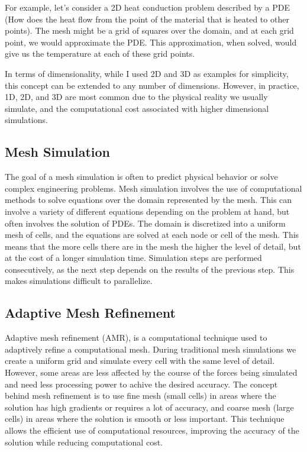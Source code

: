 \documentclass[12pt, a4paper]{scrartcl}
\begin{document}
For example, let's consider a 2D heat conduction problem described by a PDE (How does the heat flow from the point of the material
that is heated to other points). The mesh might 
be a grid of squares over the domain, and at each grid point, we would approximate the PDE. 
This approximation, when solved, would give us the temperature at each of these grid points.

In terms of dimensionality, while I used 2D and 3D as examples for simplicity, this concept 
can be extended to any number of dimensions. However, in practice, 1D, 2D, and 3D are most 
common due to the physical reality we usually simulate, and the computational cost 
associated with higher dimensional simulations.

\subsection{Mesh Simulation}

The goal of a mesh simulation is often to predict 
physical behavior or solve complex engineering problems.
Mesh simulation involves the use of computational methods to 
solve equations over the domain represented by the mesh. This can involve a variety of 
different equations depending on the problem at hand, but often involves the solution 
of PDEs. The domain is discretized into a uniform mesh of cells, and the equations are 
solved at each node or cell of the mesh. This means that the more cells there
are in the mesh the higher the level of detail, but at the cost of a longer simulation time.
Simulation steps are performed consecutively, as the next step depends on the results of the previous step.
This makes simulations difficult to parallelize.


\subsection{Adaptive Mesh Refinement}

Adaptive mesh refinement (AMR), is 
a computational technique used to adaptively refine a computational mesh. During traditional mesh 
simulations we create a uniform grid and simulate every cell with the same level of detail. However, 
some areas are less affected by the course of the forces being simulated
and need less processing power to achive the desired accuracy. The concept 
behind mesh refinement is to use fine mesh (small cells) in areas where the solution has 
high gradients or requires a lot of accuracy, and coarse mesh (large cells) in areas where 
the solution is smooth or less important. This technique allows the efficient use of 
computational resources, improving the accuracy of the solution while reducing 
computational cost.
\end{document}
